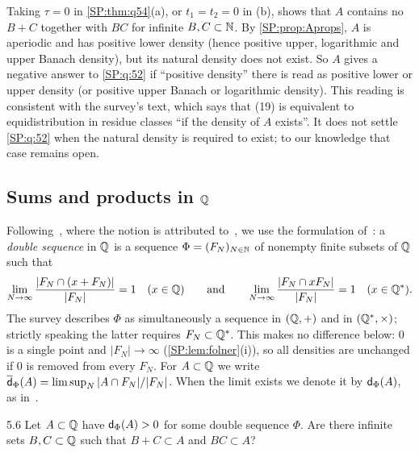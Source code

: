 \begin{remark}\label{SP:rem:q52}
Taking $\tau=0$ in \cref{SP:thm:q54}(a), or $t_1=t_2=0$ in (b), shows that $A$ contains no $B+C$
together with $BC$ for infinite $B,C\subset\mathbb{N}$. By \cref{SP:prop:Aprops}, $A$ is aperiodic and has
positive lower density (hence positive upper, logarithmic and upper Banach density), but its natural
density does not exist. So $A$ gives a negative answer to \cref{SP:q:52} if ``positive density''
there is read as positive lower or upper density (or positive upper Banach or logarithmic
density). This reading is
consistent with the survey's text, which says that (19) is equivalent to equidistribution in
residue classes ``if the density of $A$ exists''. It does not settle \cref{SP:q:52} when the
natural density is required to exist; to our knowledge that case remains open.
\end{remark}

\subsection{Sums and products in \texorpdfstring{$\mathbb{Q}$}{Q}}
\label{SP:sec:q56}

Following~\cite[\S5.1]{kra2023problems}, where the notion is attributed
to~\cite[Definition~1.3]{bergelson2017ergodic}, we use the formulation
of~\cite[Definition~1.7]{kousek2024revisiting}: a \emph{double \Fol{} sequence} in $\mathbb{Q}$ is a
sequence $\Phi=(F_N)_{N\in\mathbb{N}}$ of nonempty finite subsets of $\mathbb{Q}$ such that
\[
\lim_{N\to\infty}\frac{|F_N\cap(x+F_N)|}{|F_N|}=1\quad(x\in\mathbb{Q})
\qquad\text{and}\qquad
\lim_{N\to\infty}\frac{|F_N\cap xF_N|}{|F_N|}=1\quad(x\in\mathbb{Q}^*).
\]
The survey describes $\Phi$ as simultaneously a \Fol{} sequence in $(\mathbb{Q},+)$ and in
$(\mathbb{Q}^*,\times)$; strictly speaking the latter requires $F_N\subset\mathbb{Q}^*$. This makes no
difference below: $0$ is a single point and $|F_N|\to\infty$ (\cref{SP:lem:folner}(i)), so all
densities are unchanged if $0$ is removed from every $F_N$.
For $A\subset\mathbb{Q}$ we write $\overline{\mathsf{d}}_\Phi(A)=\limsup_N|A\cap F_N|/|F_N|$. When the limit exists we
denote it by $\mathsf{d}_\Phi(A)$, as in~\cite[\S1]{kra2023problems}.

\begin{question}{5.6}\label{SP:q:56}
Let $A\subset\mathbb{Q}$ have $\mathsf{d}_\Phi(A)>0$ for some double \Fol{} sequence $\Phi$. Are there infinite
sets $B,C\subset\mathbb{Q}$ such that $B+C\subset A$ and $BC\subset A$?
\end{question}

